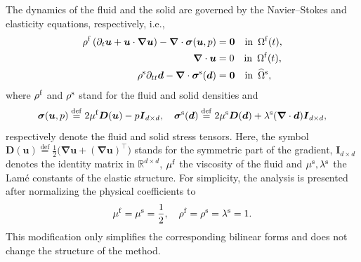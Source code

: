 \documentclass[11pt,reqno]{amsart}
\theoremstyle{definition}
\theoremstyle{plain}
\numberwithin{theorem}{section}
\numberwithin{proposition}{section}
\numberwithin{lemma}{section}
\numberwithin{equation}{section}
\newcommand{\bs}[1]{\boldsymbol{#1}}
\newcommand{\uu}[1]  {{\bs{#1}} }
\newcommand{\grad}   { \uu{\nabla}    }
\newcommand{\stress}{{\bs \sigma}}
\newcommand{\bu}{\uu{u}}
\renewcommand{\(}{\bigl(}
\renewcommand{\)}{\bigr)}
\def\eqd{\stackrel{\mathrm{def}}{=}}
\begin{document}
The dynamics of the fluid and the solid  are governed by the Navier--Stokes and elasticity equations, respectively, i.e., 
\begin{subequations}\label{eq:coupling-PDE}
\begin{align}
\rho^{\rm f}\left( \partial_t \bu   + \bu\cdot\grad\bu\right)
- \grad\cdot \stress (\bu,p)  
&= \bs 0 
\hspace{10pt}\mbox{in}\,\,\, \Omega^{\rm{f}}(t), 
\label{eq:fluid-u}\\
%
\grad\cdot \bu 
&= 0 
\hspace{10pt}\mbox{in}\,\,\, \Omega^{\rm{f}}(t), 
\label{eq:fluid-div}\\
%
\rho^{\rm s} \partial_{tt}{\bs d} - \grad\cdot{\bs\sigma}^{\rm s}({\bs d}) 
&= {\bs 0}
\hspace{10pt}\mbox{in}\,\,\,\widehat{\Omega}^{\rm s}, 
\label{eq:solid-d}
\end{align}
\end{subequations}
where $\rho^{\rm f}$ and $\rho^{\rm s}$ stand for the fluid and solid densities and 
$$
\stress(\bu, p) \eqd  2\mu^{\rm f}\bs D(\bu) -p {\bs I}_{d\times d},\quad 
{\bs\sigma}^{\rm s}({\bs d}) \eqd  2\mu^{\rm s}{\bs D}({\bs d}) + \lambda^{\rm s}(\grad\cdot {\bs d}) {\bs I}_{d\times d} ,
$$ 
respectively  denote the fluid and solid stress tensors. Here, the symbol 
$ \bs D (\bu) \eqd \frac12\big( \grad \bu + (\grad \bu)^{\top}\big)$  stands  for  the symmetric part of the gradient, ${\bs I}_{{d\times d}}$ denotes the  identity matrix in $\mathbb{R}^{d\times d}$,  
$\mu^{\rm f}$ the viscosity of the fluid and  $\mu^{\rm s} ,\lambda^{\rm s}$  the Lam\'e constants of the elastic structure. For simplicity, the analysis is presented after normalizing the physical coefficients to 
$$
\mu^{\rm f}=\mu^{\rm s}=\frac12,\quad \rho^{\rm f} = \rho^{\rm s} = \lambda^{\rm s}=1.
$$ 
This modification only simplifies the corresponding  bilinear forms and does not change the structure of the method. 
\end{document}
